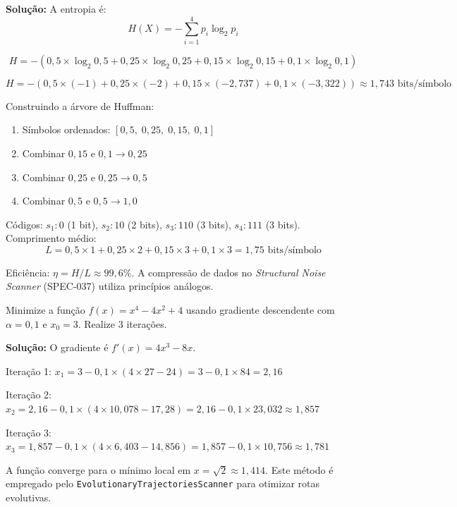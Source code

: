 \textbf{Solução:} A entropia é:
\[
H(X) = -\sum_{i=1}^{4} p_i \log_2 p_i
\]

\[
H = -(0{,}5 \times \log_2 0{,}5 + 0{,}25 \times \log_2 0{,}25
     + 0{,}15 \times \log_2 0{,}15 + 0{,}1 \times \log_2 0{,}1)
\]

\[
H = -(0{,}5 \times (-1) + 0{,}25 \times (-2) + 0{,}15 \times (-2{,}737)
     + 0{,}1 \times (-3{,}322)) \approx 1{,}743 \text{ bits/símbolo}
\]

Construindo a árvore de Huffman:
\begin{enumerate}
\item Símbolos ordenados: \([0{,}5,\; 0{,}25,\; 0{,}15,\; 0{,}1]\)
\item Combinar \(0{,}15\) e \(0{,}1 \to 0{,}25\)
\item Combinar \(0{,}25\) e \(0{,}25 \to 0{,}5\)
\item Combinar \(0{,}5\) e \(0{,}5 \to 1{,}0\)
\end{enumerate}

Códigos: \(s_1: 0\) (1 bit), \(s_2: 10\) (2 bits), \(s_3: 110\) (3 bits),
\(s_4: 111\) (3 bits). Comprimento médio:
\[
L = 0{,}5 \times 1 + 0{,}25 \times 2 + 0{,}15 \times 3 + 0{,}1 \times 3
  = 1{,}75 \text{ bits/símbolo}
\]

Eficiência: \(\eta = H/L \approx 99{,}6\%\). A compressão de dados no
\emph{Structural Noise Scanner} (SPEC-037) utiliza princípios análogos.

\begin{exercicio}\label{exer:resol-grad}
Minimize a função \(f(x) = x^4 - 4x^2 + 4\) usando gradiente descendente
com \(\alpha = 0{,}1\) e \(x_0 = 3\). Realize 3 iterações.
\end{exercicio}

\textbf{Solução:} O gradiente é \(f'(x) = 4x^3 - 8x\).

Iteração 1: \(x_1 = 3 - 0{,}1 \times (4 \times 27 - 24) = 3 - 0{,}1 \times 84 = 2{,}16\)

Iteração 2: \(x_2 = 2{,}16 - 0{,}1 \times (4 \times 10{,}078 - 17{,}28)
          = 2{,}16 - 0{,}1 \times 23{,}032 \approx 1{,}857\)

Iteração 3: \(x_3 = 1{,}857 - 0{,}1 \times (4 \times 6{,}403 - 14{,}856)
          = 1{,}857 - 0{,}1 \times 10{,}756 \approx 1{,}781\)

A função converge para o mínimo local em \(x = \sqrt{2} \approx 1{,}414\).
Este método é empregado pelo \texttt{EvolutionaryTrajectoriesScanner} para
otimizar rotas evolutivas.

